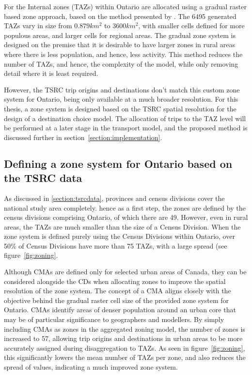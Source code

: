 For the Internal zones (TAZs) within Ontario are allocated using a gradual raster based zone approach, based on the method presented by \textcite{moeckel2015gradual}. The 6495 generated TAZs vary in size from $0.879 km^2$ to $3600km^2$, with smaller cells defined for more populous areas, and larger cells for regional areas. The gradual zone system is designed on the premise that it is desirable to have larger zones in rural areas where there is less population, and hence, less activity. This method reduces the number of TAZs, and hence, the complexity of the model, while only removing detail where it is least required. 

However, the TSRC trip origins and destinations don't match this custom zone system for Ontario, being only available at a much broader resolution. For this thesis, a zone system is designed based on the TSRC spatial resolution for the design of a destination choice model. The allocation of trips to the TAZ level will be performed at a later stage in the transport model, and the proposed method is discussed further in section~\ref{section:implementation}.


\subsection{Defining a zone system for Ontario based on the TSRC data}
As discussed in \ref{section:tsrcdata}, provinces and census divisions cover the national study area completely. hence as a first step, the zones are defined by the census divisions comprising Ontario, of which there are 49. However, even in rural areas, the TAZs are much smaller than the size of a Census Division. When the zone system is defined purely using the Census Divisions within Ontario, over 50\% of Census Divisions have more than 75 TAZs, with a large spread (see figure~\ref{fig:zoning}. 

Although CMAs are defined only for selected urban areas of Canada, they can be considered alongside the CDs when allocating zones to improve the spatial resolution of the zone system. The concept of a CMA aligns closely with the objective behind the gradual raster cell size of the provided zone system for Ontario. CMAs identify areas of denser population around an urban core that may be of particular significance to geographers and modellers. By simply including CMAs as zones in the aggregated zoning model, the number of zones is increased to 57, allowing trip origins and destinations in urban areas to be more accurately assigned during disaggregation to TAZs. As seen in figure~\ref{fig:zoning}, this significantly lowers the mean number of TAZs per zone, and also reduces the spread of values, indicating a much improved zone system. 


